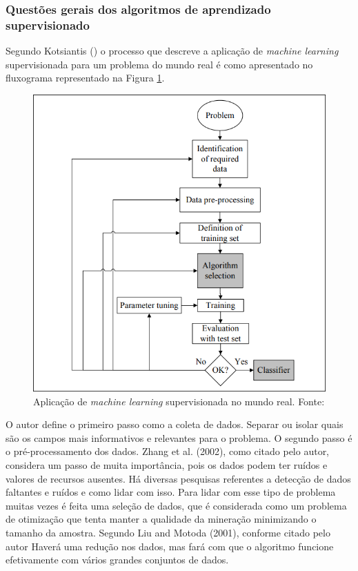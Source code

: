 \subsubsection{Questões gerais dos algoritmos de aprendizado supervisionado}
	
Segundo Kotsiantis (\citeyear{Kotsiantis}) o processo que descreve a aplicação de \textit{machine learning} supervisionada para um problema do mundo real é como apresentado no fluxograma representado na Figura \ref{fig:aplicacao_ml}.

\begin{figure}[H]
    \centering
    \includegraphics[scale=0.4]{figuras/referencial_teorico/aplicacao_ml.png}
    \caption[Aplicação de machine learning supervisionada no mundo real]{Aplicação de \textit{machine learning} supervisionada no mundo real. Fonte: \cite{Kotsiantis}}
    \label{fig:aplicacao_ml}
\end{figure}

O autor define o primeiro passo como a coleta de dados. Separar ou isolar quais são os campos mais informativos e relevantes para o problema. O segundo passo é o pré-processamento dos dados. Zhang et al. (2002), como citado pelo autor, considera um passo de muita importância, pois os dados podem ter ruídos e valores de recursos ausentes. Há diversas pesquisas referentes a detecção de dados faltantes e ruídos e como lidar com isso. Para lidar com esse tipo de problema muitas vezes é feita uma seleção de dados, que é considerada como um problema de otimização que tenta manter a qualidade da mineração minimizando o tamanho da amostra. Segundo Liu and Motoda (2001), conforme citado pelo autor Haverá uma redução nos dados, mas fará com que o algoritmo funcione efetivamente com vários grandes conjuntos de dados.

